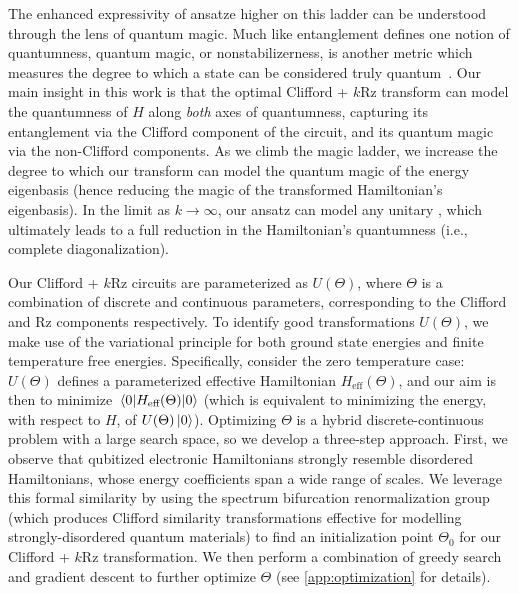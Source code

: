 \documentclass[a4paper,accepted=2024-07-10]{quantumarticle}
\begin{document}
The enhanced expressivity of ansatze higher on this ladder can be understood through the lens of quantum magic. Much like entanglement defines one notion of quantumness, quantum magic, or nonstabilizerness, is another metric which measures the degree to which a state can be considered truly quantum~\cite{howard2017application,seddon2019quantifying}.  Our main insight in this work is that the optimal Clifford + $k$Rz transform can model the quantumness of $H$ along \textit{both} axes of quantumness, capturing its entanglement via the Clifford component of the circuit, and its quantum magic via the non-Clifford components. As we climb the magic ladder, we increase the degree to which our transform can model the quantum magic of the energy eigenbasis (hence reducing the magic of the transformed Hamiltonian's eigenbasis). In the limit as $k \rightarrow \infty$, our ansatz can model any unitary \cite{Nebe2006}, which ultimately leads to a full reduction in the Hamiltonian's quantumness (i.e., complete diagonalization). 

Our Clifford + $k$Rz circuits are parameterized as $U(\Theta)$, where $\Theta$ is a combination of discrete and continuous parameters, corresponding to the Clifford and Rz components respectively. To identify good transformations $U(\Theta)$, we make use of the variational principle for both ground state energies and finite temperature free energies. Specifically, consider the zero temperature case: $U(\Theta)$ defines a parameterized effective Hamiltonian $H_{\text{eff}}(\Theta)$, and our aim is then to minimize $\expval{H_{\text{eff}}(\Theta)}{0}$ (which is equivalent to minimizing the energy, with respect to $H$, of $U(\Theta) \ket{0}$). Optimizing $\Theta$ is a hybrid discrete-continuous problem with a large search space, so we develop a three-step approach. First, we observe that qubitized electronic Hamiltonians strongly resemble disordered Hamiltonians, whose energy coefficients span a wide range of scales. We leverage this formal similarity by using the spectrum bifurcation renormalization group \cite{PhysRevB.93.104205,PhysRevB.103.L100207,PhysRevB.94.014205} (which produces Clifford similarity transformations effective for modelling strongly-disordered quantum materials) to find an initialization point $\Theta_0$ for our Clifford + $k$Rz transformation. We then perform a combination of greedy search and gradient descent to further optimize $\Theta$ (see \cref{app:optimization} for details). 
\end{document}

